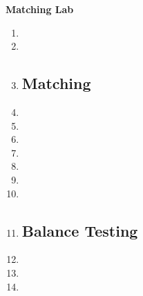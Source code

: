 \documentclass[a4paper,12pt]{article}
\begin{document}
\begin{center}
\textbf{Matching Lab}
\end{center}




\begin{enumerate}\itemsep0.5em

\subsection*{Balance Testing}

\item %
\item %
\item %


\subsection*{Matching}

\item %
\item %

\item %
\item %

\item %
\item %

\item %
\item %


\subsection*{Balance Testing}

\item %
\item %
\item %


\end{enumerate}
\end{document}
